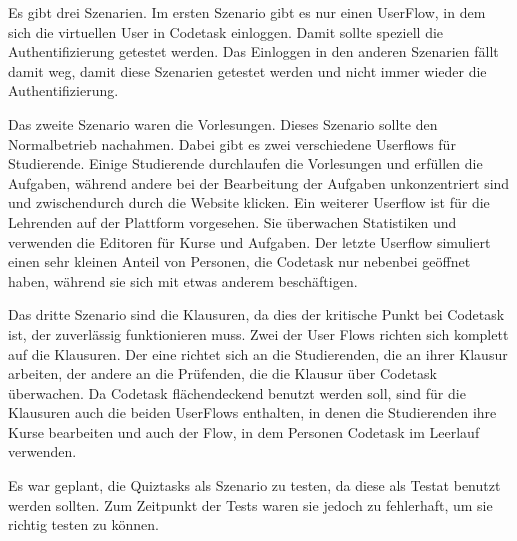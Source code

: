 Es gibt drei Szenarien. Im ersten Szenario gibt es nur einen UserFlow, in dem sich die virtuellen User in Codetask einloggen. Damit sollte speziell die Authentifizierung getestet werden.
Das Einloggen in den anderen Szenarien fällt damit weg, damit diese Szenarien getestet werden und nicht immer wieder die Authentifizierung.

Das zweite Szenario waren die Vorlesungen. Dieses Szenario sollte den Normalbetrieb nachahmen. Dabei gibt es zwei verschiedene Userflows für Studierende.
Einige Studierende durchlaufen die Vorlesungen und erfüllen die Aufgaben, während andere bei der Bearbeitung der Aufgaben unkonzentriert sind und zwischendurch durch die Website klicken.
Ein weiterer Userflow ist für die Lehrenden auf der Plattform vorgesehen. Sie überwachen Statistiken und verwenden die Editoren für Kurse und Aufgaben.
Der letzte Userflow simuliert einen sehr kleinen Anteil von Personen, die Codetask nur nebenbei geöffnet haben, während sie sich mit etwas anderem beschäftigen.

Das dritte Szenario sind die Klausuren, da dies der kritische Punkt bei Codetask ist, der zuverlässig funktionieren muss.
Zwei der User Flows richten sich komplett auf die Klausuren. Der eine richtet sich an die Studierenden, die an ihrer Klausur arbeiten, der andere an die Prüfenden, die die Klausur über Codetask überwachen.
Da Codetask flächendeckend benutzt werden soll, sind für die Klausuren auch die beiden UserFlows enthalten, in denen die Studierenden ihre Kurse bearbeiten und auch der Flow, in dem Personen Codetask im Leerlauf verwenden.

Es war geplant, die Quiztasks als Szenario zu testen, da diese als Testat benutzt werden sollten. Zum Zeitpunkt der Tests waren sie jedoch zu fehlerhaft, um sie richtig testen zu können.